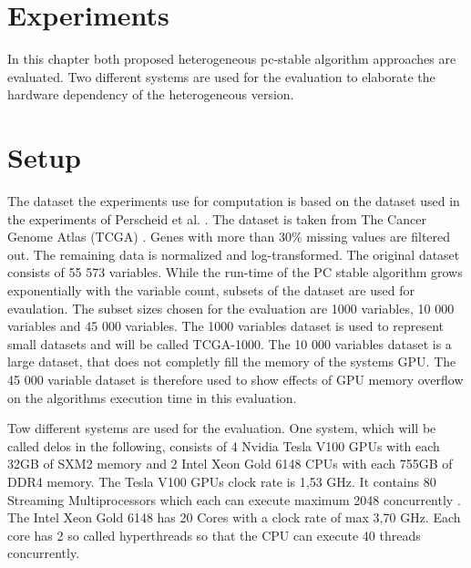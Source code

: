 \chapter{Experiments}
In this chapter both proposed heterogeneous pc-stable algorithm approaches are evaluated. Two different systems are used for the evaluation to elaborate the hardware dependency of the heterogeneous version.

\chapter{Setup}
The dataset the experiments use for computation is based on the dataset used in the experiments of Perscheid et al. \cite{perscheidIntegrativeGeneSelection2018}. The dataset is taken from The Cancer Genome Atlas (TCGA) \cite{weinsteinCancerGenomeAtlas2013}. Genes with more than 30\% missing values are filtered out. The remaining data is normalized and log-transformed. The original dataset consists of 55 573 variables. While the run-time of the PC stable algorithm grows exponentially with the variable count, subsets of the dataset are used for evaulation. The subset sizes chosen for the evaluation are 1000 variables, 10 000 variables and 45 000 variables. The 1000 variables dataset is used to represent small datasets and will be called TCGA-1000. The 10 000 variables dataset is a large dataset, that does not completly fill the memory of the systems GPU. The 45 000 variable dataset is therefore used to show effects of GPU memory overflow on the algorithms execution time in this evaluation.

Tow different systems are used for the evaluation. One system, which will be called delos in the following, consists of 4 Nvidia Tesla V100 GPUs with each 32GB of SXM2 memory and 2 Intel Xeon Gold 6148 CPUs with each 755GB of DDR4 memory. The Tesla V100 GPUs clock rate is 1,53 GHz. It contains 80 Streaming Multiprocessors which each can execute maximum 2048 concurrently \cite{NVIDIATESLAV1002017}. The Intel Xeon Gold 6148 has 20 Cores with a clock rate of max 3,70 GHz. Each core has 2 so called hyperthreads so that the CPU can execute 40 threads concurrently.


